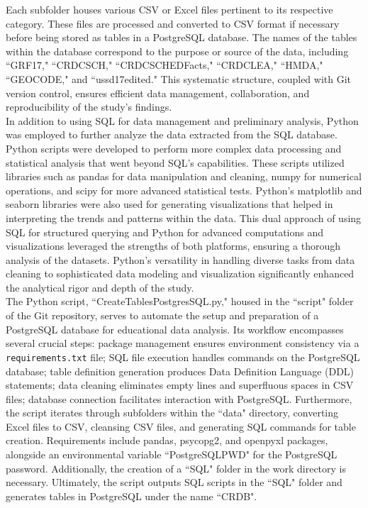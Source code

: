 \documentclass[sn-mathphys-num]{sn-jnl}%
\theoremstyle{thmstyleone}%
\theoremstyle{thmstyletwo}%
\theoremstyle{thmstylethree}%
\begin{document}
Each subfolder houses various CSV or Excel files pertinent to its respective category. These files are processed and converted to CSV format if necessary before being stored as tables in a PostgreSQL database. The names of the tables within the database correspond to the purpose or source of the data, including ``GRF17," ``CRDC\textunderscore SCH," ``CRDC{\textunderscore}SCH{\textunderscore}EDFacts," ``CRDC{\textunderscore}LEA," ``HMDA," ``GEOCODE," and ``ussd17{\textunderscore edited." This systematic structure, coupled with Git version control, ensures efficient data management, collaboration, and reproducibility of the study's findings.\\

In addition to using SQL for data management and preliminary analysis, Python was employed to further analyze the data extracted from the SQL database. Python scripts were developed to perform more complex data processing and statistical analysis that went beyond SQL's capabilities. These scripts utilized libraries such as pandas for data manipulation and cleaning, numpy for numerical operations, and scipy for more advanced statistical tests. Python's matplotlib and seaborn libraries were also used for generating visualizations that helped in interpreting the trends and patterns within the data. This dual approach of using SQL for structured querying and Python for advanced computations and visualizations leveraged the strengths of both platforms, ensuring a thorough analysis of the datasets. Python’s versatility in handling diverse tasks from data cleaning to sophisticated data modeling and visualization significantly enhanced the analytical rigor and depth of the study.\\

The Python script, ``CreateTablesPostgresSQL.py," housed in the ``script" folder of the Git repository, serves to automate the setup and preparation of a PostgreSQL database for educational data analysis. Its workflow encompasses several crucial steps: package management ensures environment consistency via a \texttt{requirements.txt} file; SQL file execution handles commands on the PostgreSQL database; table definition generation produces Data Definition Language (DDL) statements; data cleaning eliminates empty lines and superfluous spaces in CSV files; database connection facilitates interaction with PostgreSQL. Furthermore, the script iterates through subfolders within the ``data" directory, converting Excel files to CSV, cleansing CSV files, and generating SQL commands for table creation. Requirements include pandas, psycopg2, and openpyxl packages, alongside an environmental variable ``PostgreSQL{\textunderscore}PWD" for the PostgreSQL password. Additionally, the creation of a ``SQL" folder in the work directory is necessary. Ultimately, the script outputs SQL scripts in the ``SQL" folder and generates tables in PostgreSQL under the name ``CRDB".\\

}
\end{document}
